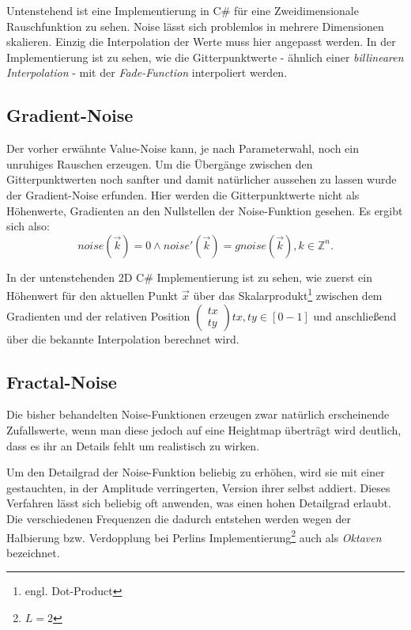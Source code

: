 Untenstehend ist eine Implementierung in C\# für eine Zweidimensionale Rauschfunktion zu sehen.
Noise lässt sich problemlos in mehrere Dimensionen skalieren. Einzig die Interpolation der Werte muss hier angepasst werden. In der Implementierung ist zu sehen, wie die Gitterpunktwerte - ähnlich einer \emph{billinearen Interpolation} - mit der \emph{Fade-Function} interpoliert werden.

\label{valueNoise.cs}

\subsection{Gradient-Noise}\label{Gradient-Noise}
Der vorher erwähnte Value-Noise kann, je nach Parameterwahl, noch ein unruhiges Rauschen erzeugen. Um die Übergänge zwischen den Gitterpunktwerten noch sanfter und damit natürlicher aussehen zu lassen wurde der Gradient-Noise erfunden.
Hier werden die Gitterpunktwerte nicht als Höhenwerte, Gradienten an den Nullstellen der Noise-Funktion gesehen.
Es ergibt sich also:
\begin{equation}
noise(\vec{k}) = 0 \land 
noise'(\vec{k}) = gnoise(\vec{k}),  k \in \mathbb{Z}^n  .
\end{equation}

In der untenstehenden 2D C\# Implementierung ist zu sehen, wie zuerst ein Höhenwert für den aktuellen Punkt  $\vec{x}$ über das Skalarprodukt\footnote{engl. Dot-Product} zwischen dem Gradienten und der relativen Position $\begin{pmatrix}tx\\ty\end{pmatrix}  tx, ty\in [0-1]$ und anschließend über die bekannte Interpolation berechnet wird.


 

\subsection{Fractal-Noise}\label{Fractal-Noise}

Die bisher behandelten Noise-Funktionen erzeugen zwar natürlich erscheinende Zufallswerte, wenn man diese jedoch auf eine Heightmap überträgt wird deutlich, dass es ihr an Details fehlt um realistisch zu wirken.

Um den Detailgrad der Noise-Funktion beliebig zu erhöhen, wird sie mit einer gestauchten, in der Amplitude verringerten, Version ihrer selbst addiert. 
Dieses Verfahren lässt sich beliebig oft anwenden, was einen hohen Detailgrad erlaubt.
Die verschiedenen Frequenzen die dadurch entstehen werden wegen der Halbierung bzw. Verdopplung bei Perlins Implementierung\footnote{$L=2$} auch als \emph{Oktaven} bezeichnet.

